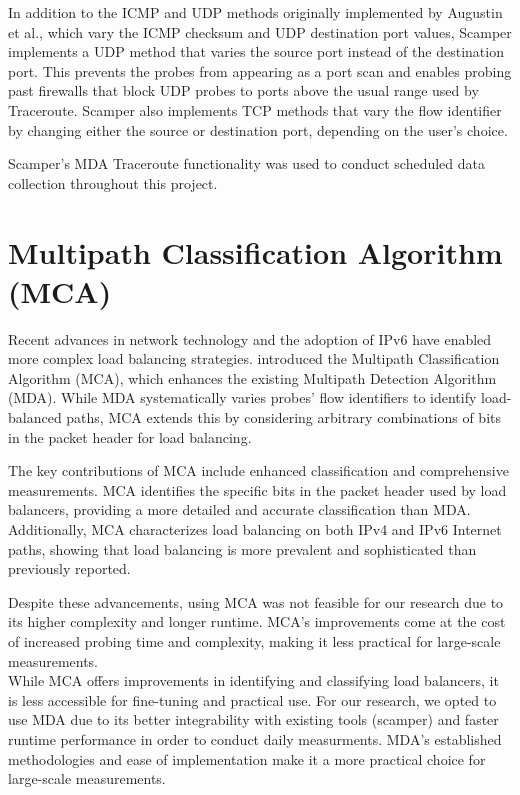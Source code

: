 \documentclass[12pt]{cwru_thesis}
\begin{document}
In addition to the ICMP and UDP methods originally implemented by Augustin et al., which vary the ICMP checksum and UDP destination port values, Scamper implements a UDP method that varies the source port instead of the destination port. This prevents the probes from appearing as a port scan and enables probing past firewalls that block UDP probes to ports above the usual range used by Traceroute. Scamper also implements TCP methods that vary the flow identifier by changing either the source or destination port, depending on the user’s choice.

Scamper's MDA Traceroute functionality was used to conduct scheduled data collection throughout this project.

\section{Multipath Classification Algorithm (MCA)}

Recent advances in network technology and the adoption of IPv6 have enabled more complex load balancing strategies.  \cite{9155387} introduced the Multipath Classification Algorithm (MCA), which enhances the existing Multipath Detection Algorithm (MDA). While MDA systematically varies probes' flow identifiers to identify load-balanced paths, MCA extends this by considering arbitrary combinations of bits in the packet header for load balancing.

The key contributions of MCA include enhanced classification and comprehensive measurements. MCA identifies the specific bits in the packet header used by load balancers, providing a more detailed and accurate classification than MDA. Additionally, MCA characterizes load balancing on both IPv4 and IPv6 Internet paths, showing that load balancing is more prevalent and sophisticated than previously reported.


Despite these advancements, using MCA was not feasible for our research due to its higher complexity and longer runtime. MCA's improvements come at the cost of increased probing time and complexity, making it less practical for large-scale measurements.\\



While MCA offers improvements in identifying and classifying load balancers, it is less accessible for fine-tuning and practical use. For our research, we opted to use MDA due to its better integrability with existing tools (scamper) and faster runtime performance in order to conduct daily measurments. MDA's established methodologies and ease of implementation make it a more practical choice for large-scale measurements. 
 
\end{document}
